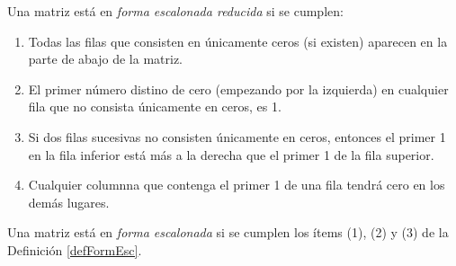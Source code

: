 \documentclass[alge.tex]{subfiles}
\begin{document}

\begin{mydef}\label{defFormEsc}
  Una matriz est\'a en \emph{forma escalonada reducida} si se cumplen:
  \begin{enumerate}
  \item Todas las filas que consisten en \'unicamente ceros (si existen)
    aparecen en la parte de abajo de la matriz.
  \item El primer n\'umero distino de cero (empezando por la izquierda)
    en cualquier fila que no consista \'unicamente en ceros, es 1.
  \item Si dos filas sucesivas no consisten \'unicamente en ceros,
    entonces el primer 1 en la fila inferior est\'a m\'as a la derecha
    que el primer 1 de la fila superior.
  \item Cualquier columnna que contenga el primer 1 de una fila tendr\'a
    cero en los dem\'as lugares.
  \end{enumerate}
\end{mydef}

\begin{mydef}
  Una matriz est\'a en \emph{forma escalonada} si se cumplen los \'items
  (1), (2) y (3) de la Definici\'on \ref{defFormEsc}.
\end{mydef}


\vspace{.25cm}
\end{document}
